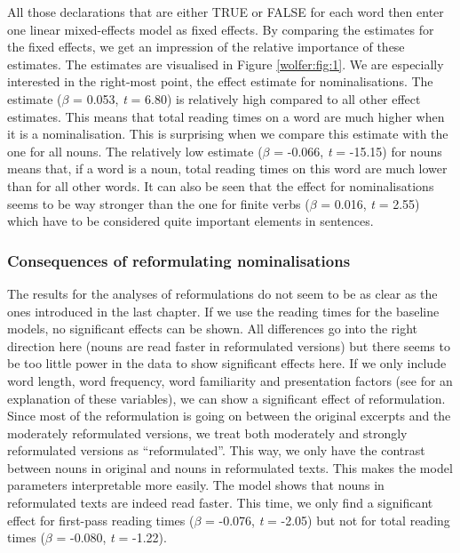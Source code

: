 \documentclass[output=paper]{langsci/langscibook}
\begin{document}
All those declarations that are either TRUE or FALSE for each word then enter one linear mixed-effects model as fixed effects. By comparing the estimates for the fixed effects, we get an impression of the relative importance of these estimates. The estimates are visualised in Figure \ref{wolfer:fig:1}. We are especially interested in the right-most point, the effect estimate for nominalisations. The estimate (\textit{$\beta $} = 0.053, \textit{t} = 6.80) is relatively high compared to all other effect estimates. This means that total reading times on a word are much higher when it is a nominalisation. This is surprising when we compare this estimate with the one for all nouns. The relatively low estimate (\textit{$\beta $} = -0.066, \textit{t} = -15.15) for nouns means that, if a word is a noun, total reading times on this word are much lower than for all other words. It can also be seen that the effect for nominalisations seems to be way stronger than the one for finite verbs (\textit{$\beta $} = 0.016, \textit{t} = 2.55) which have to be considered quite important elements in sentences.

\subsubsection{Consequences of reformulating nominalisations}

The results for the analyses of reformulations do not seem to be as clear as the ones introduced in the last chapter. If we use the reading times for the baseline models, no significant effects can be shown. All differences go into the right direction here (nouns are read faster in reformulated versions) but there seems to be too little power in the data to show significant effects here. If we only include word length, word frequency, word familiarity and presentation factors (see  for an explanation of these variables), we can show a significant effect of reformulation. Since most of the reformulation is going on between the original excerpts and the moderately reformulated versions, we treat both moderately and strongly reformulated versions as “reformulated”. This way, we only have the contrast between nouns in original and nouns in reformulated texts. This makes the model parameters interpretable more easily. The model shows that nouns in reformulated texts are indeed read faster. This time, we only find a significant effect for first-pass reading times (\textit{$\beta $} = -0.076, \textit{t} = -2.05) but not for total reading times (\textit{$\beta $} = -0.080, \textit{t} = -1.22).
\end{document}
